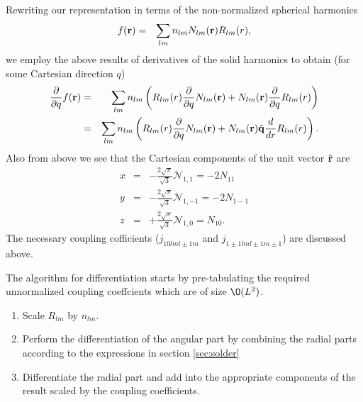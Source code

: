 \documentclass[12pt]{article}
\newcommand{\N}{\mathcal{N}}
\newcommand{\rv}{\vb{r}}
\newcommand{\rhat}{\hat{\rv}}
\begin{document}
Rewriting our representation in terms of the non-normalized spherical harmonics
\begin{eqnarray}
  f(\rv) & = & \sum_{l m} n_{lm} N_{lm}(\rv) R_{lm}(r) ,
\end{eqnarray}
we employ the above results of derivatives of the solid harmonics to obtain (for some Cartesian direction $q$)
\begin{eqnarray}
  \frac{\partial}{\partial q} f(\rv) & = & \sum_{l m} n_{lm} \left(R_{lm}(r) \frac{\partial}{\partial q} N_{lm}(\rv)  + N_{lm}(\rv)  \frac{\partial}{\partial q} R_{lm}(r) \right) \\
   & = & \sum_{l m} n_{lm} \left( R_{lm}(r) \frac{\partial}{\partial q} N_{lm}(\rv)  + N_{lm}(\rv) \hat{\vb{q}} \frac{d}{dr} R_{lm}(r) \right).
\end{eqnarray}
Also from above we see that the Cartesian components of the unit vector $\rhat$ are
\begin{eqnarray}
  x & = & - \frac{2 \sqrt{\pi}}{\sqrt{3}} \N_{1,1} = -2 N_{11}\\
  y & = & - \frac{2 \sqrt{\pi}}{\sqrt{3}} \N_{1,-1}= -2 N_{1-1} \\
  z & = & + \frac{2 \sqrt{\pi}}{\sqrt{3}} \N_{1,0} = N_{10}.
\end{eqnarray}
The necessary coupling cofficients ($j_{1 0 l m l\pm 1 m}$ and $j_{1 \pm 1 l m l\pm 1 m\pm 1}$) are discussed above.

The algorithm for differentiation starts by pre-tabulating the required unnormalized coupling coeffcients which are of size $\O(L^2)$.
\begin{enumerate}
\item Scale $R_{lm}$ by $n_{lm}$. 
\item Perform the differentiation of the angular part by combining the radial parts according to the expressions in section \ref{sec:solder}
\item Differentiate the radial part and add into the appropriate components of the result scaled by the coupling coefficients.
\end{enumerate}
  
\end{document}

